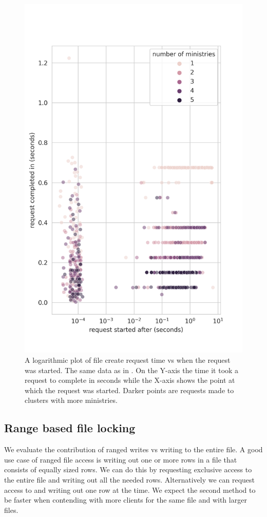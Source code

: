 \begin{figure}[bp]
	\centering
	\includegraphics[height=\textheight]{../results/plots/touch_vs_time.png}
	\caption{A logarithmic plot of file create request time vs when the request was started. The same data as in . On the Y-axis the time it took a request to complete in seconds while the X-axis shows the point at which the request was started. Darker points are requests made to clusters with more ministries.}
	\label{fig:touch_vs_time}
\end{figure}

\clearpage{}
\subsection{Range based file locking}
We evaluate the contribution of ranged writes vs writing to the entire file. A good use case of ranged file access is writing out one or more rows in a file that consists of equally sized rows. We can do this by requesting exclusive access to the entire file and writing out all the needed rows. Alternatively we can request access to and writing out one row at the time. We expect the second method to be faster when contending with more clients for the same file and with larger files.

